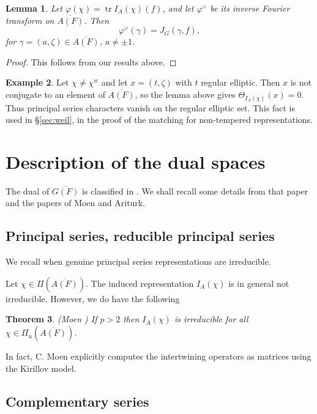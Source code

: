 \documentclass[12pt,letterpaper,openany]{book}
\theoremstyle{plain}
\newtheorem{theorem}{Theorem}[chapter]
\newtheorem{lemma}[theorem]{Lemma}
\theoremstyle{definition}
\newtheorem{example}[theorem]{Example}
\theoremstyle{remark}
\theoremstyle{remark}
\newcommand{\tr}{\operatorname{tr}}
\begin{document}
\begin{lemma}
Let $\varphi(\chi)=\tr I_A(\chi)(f)$, and let $\varphi^\vee$ be its inverse
Fourier transform on $\overline{A(F)}$. Then
\[
\varphi^\vee(\gamma)
=J_G(\gamma,f),
\]
for $\gamma =(a,\zeta)\in \overline{A(F)}$, $a\not= \pm 1$.
\end{lemma}

\begin{proof} This follows from our results above.
\end{proof}

\begin{example}
Let $\chi\neq\chi^w$ and let $x=(t,\zeta)$ with $t$ regular elliptic. Then
$x$ is not conjugate to an element of $\overline{A(F)}$, so the lemma above
gives $\Theta_{I_A(\chi)}(x)=0$. Thus principal series characters vanish on
the regular elliptic set. This fact is used in
\S\ref{sec:weil}, in the proof of the matching for non-tempered
representations.
\end{example}

\section{Description of the dual spaces}

The dual of $\overline{G(F)}$ is classified in \cite{Wa2}.
We shall recall some details from that paper and the
papers of Moen and Ariturk.

\subsection{Principal series, reducible principal series}

We recall when genuine principal series representations are irreducible.


Let $\chi \in \Pi (\overline{A(F)})$. The induced representation
$I_{A}(\chi )$ is in general not irreducible. However, we do have the
following

\begin{theorem}
(Moen \cite{Mo2}) If $p>2$ then $I_{A}(\chi )$ is
irreducible for all $\chi \in \Pi _u(\overline{A(F)})$.
\end{theorem}

In fact, C. Moen \cite{Mo1}
explicitly computes the intertwining operators as
matrices using the Kirillov model.

\subsection{Complementary series}
\end{document}
